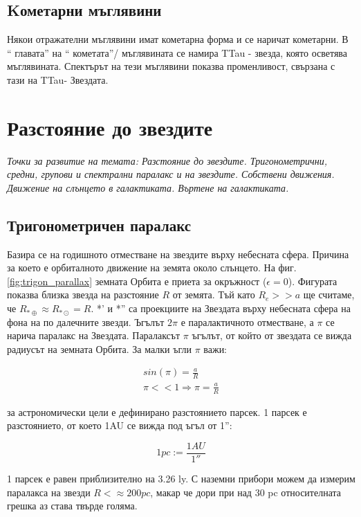 \documentclass[a4paper,12pt]{article}
\begin{document}
\subsection{Kометарни мъглявини}
Някои отражателни мъглявини имат кометарна форма и се наричат кометарни. В `` главата'' на `` кометата''/ мъглявината се намира TTau - звезда, която осветява мъглявината. Спектърът на тези мъглявини показва променливост, свързана с тази на TTau- Звездата.


\section{Разстояние до звездите}
\textit{Точки за развитие на темата: Разстояние до звездите. Тригонометрични, средни, групови и спектрални паралакс и на звездите. Собствени движения. Движение на слънцето в галактиката. Въртене на галактиката.}

\subsection{Тригонометричен паралакс}
\label{sec:trig_parallax}
Базира се на годишното отместване на звездите върху небесната сфера. Причина за което е орбиталното движение на земята около слънцето. На фиг. \ref{fig:trigon_parallax} земната Орбита е приета за окръжност ($\epsilon =0$).  Фигурата показва близка звезда на разстояние $R$ от земята. Тъй като $R_e>>a$ ще считаме, че $R_{* \oplus} \approx R_{* \odot}=R$. *' и *''  са проекциите на Звездата върху небесната сфера на фона на по далечните звезди. Ъгълът $2\pi$  е паралактичното отместване, а $\pi$ се нарича паралакс на Звездата. Паралаксът $\pi$  ъгълът, от който от звездата се вижда радиусът на земната Орбита.  За малки ъгли $\pi$  важи:

\begin{gather}
    sin(\pi) = \frac{a}{R}\\
    \pi << 1 \Rightarrow \pi = \frac{a}{R}
\end{gather}

за астрономически цели е дефинирано разстоянието парсек. 1 парсек е разстоянието, от което 1AU се вижда под ъгъл от 1'':

\begin{equation}
    1pc := \frac{1AU}{1''}
\end{equation}

1 парсек е равен приблизително на 3.26 ly. С наземни прибори можем да измерим паралакса на звезди $R < \approx 200 pc$,  макар че дори при над 30 pc относителната грешка аз става твърде голяма.
\end{document}
